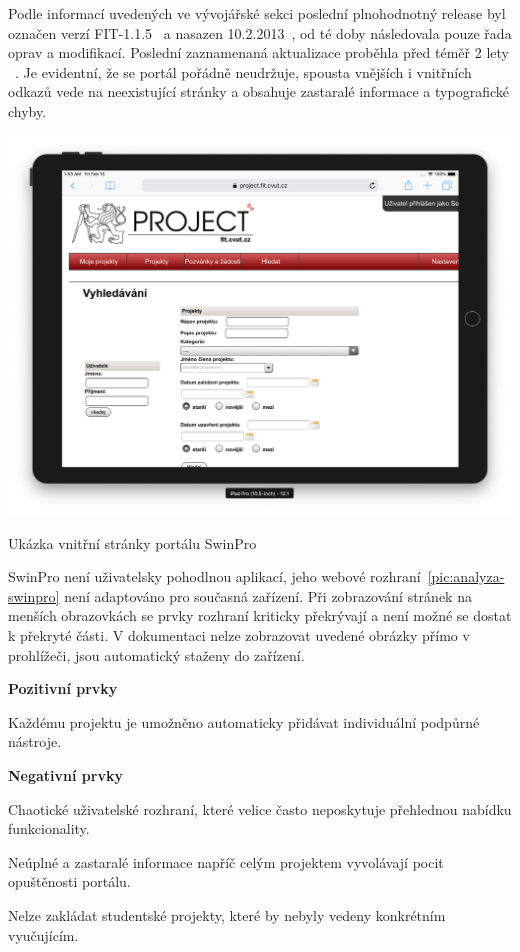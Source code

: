 Podle informací uvedených ve vývojářské sekci poslední plnohodnotný release byl označen verzí FIT-1.1.5~\cite{swinproDevpage} a nasazen 10.2.2013~\cite{swinproDevpage1645}, od té doby následovala pouze řada oprav a modifikací. Poslední zaznamenaná aktualizace proběhla před téměř 2 lety ~\cite{swinproDevpage1907}. Je evidentní, že se portál pořádně neudržuje, spousta vnějších i vnitřních odkazů vede na neexistující stránky a obsahuje zastaralé informace a typografické chyby.


\begin{fig:illustration}
   \includegraphics[width=1\textwidth]{images/analyza-swinpro.png}
   \caption{Ukázka vnitřní stránky portálu SwinPro}\label{pic:analyza-swinpro}
\end{fig:illustration}

SwinPro není uživatelsky pohodlnou aplikací, jeho webové rozhraní~\ref{pic:analyza-swinpro} není adaptováno pro současná zařízení. Při zobrazování stránek na menších obrazovkách se prvky rozhraní kriticky překrývají a není možné se dostat k překryté části. V dokumentaci nelze zobrazovat uvedené obrázky přímo v prohlížeči, jsou automatický staženy do zařízení.

\textbf{Pozitivní prvky}
\begin{ul}
   \item Každému projektu je umožněno automaticky přidávat individuální podpůrné nástroje.
\end{ul}

\textbf{Negativní prvky}
\begin{ul}
   \item Chaotické uživatelské rozhraní, které velice často neposkytuje přehlednou nabídku funkcionality.
   \item Neúplné a zastaralé informace napříč celým projektem vyvolávají pocit opuštěnosti portálu.
   \item Nelze zakládat studentské projekty, které by nebyly vedeny konkrétním vyučujícím.
\end{ul}


